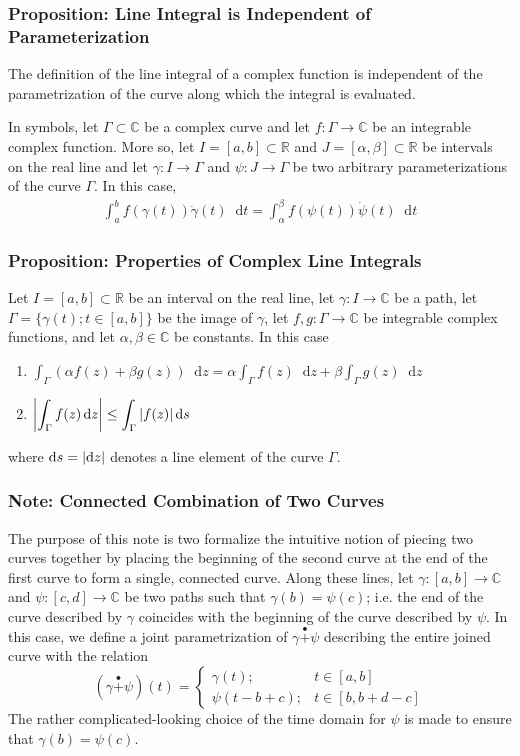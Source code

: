 \documentclass[11pt, a4paper]{article}
\newcommand{\diff}{\mathop{}\!\mathrm{d}} %
\newcommand{\R}{\mathbb{R}} %
\newcommand{\C}{\mathbb{C}} %
\begin{document}
\subsubsection{Proposition: Line Integral is Independent of Parameterization}
The definition of the line integral of a complex function is independent of the parametrization of the curve along which the integral is evaluated. 

In symbols, let $ \Gamma \subset \C $ be a complex curve and let $ f: \Gamma \to \C $ be an integrable complex function. More so, let $ I = [a, b] \subset \R $ and $ J =[\alpha, \beta] \subset \R  $ be intervals on the real line and let $ \gamma: I \to \Gamma $ and $ \psi: J \to \Gamma $ be two arbitrary parameterizations of the curve $ \Gamma $. In this case,
\begin{align*}
	\int_{a}^{b}f(\gamma(t)) \dot{\gamma}(t) \diff t = \int_{\alpha }^{\beta}f(\psi(t)) \dot{\psi}(t) \diff t
\end{align*}

\subsubsection{Proposition: Properties of Complex Line Integrals}
Let $ I = [a, b] \subset \R $ be an interval on the real line, let $ \gamma: I \to \C $ be a path, let $ \Gamma = \{ \gamma(t) ; t \in [a, b] \} $ be the image of $ \gamma $, let $ f, g: \Gamma \to \C $ be integrable complex functions, and let $ \alpha, \beta \in \C $ be constants. In this case
\begin{enumerate}
	\item $ \displaystyle{\int_{\Gamma}(\alpha f(z) + \beta g(z))\diff z = \alpha \int_{\Gamma} f(z) \diff z + \beta \int_{\Gamma} g(z) \diff z } $
	
	\item $ \displaystyle{\abs{\int_{\Gamma} f(z) \diff z } \leq \int_{\Gamma} \abs{f(z)} \diff s } $
\end{enumerate}
where $ \diff s = \abs{\diff z}$ denotes a line element of the curve $ \Gamma $.

\subsubsection{Note: Connected Combination of Two Curves}
The purpose of this note is two formalize the intuitive notion of piecing two curves together by placing the beginning of the second curve at the end of the first curve to form a single, connected curve.  Along these lines, let $ \gamma:[a, b] \to \C $ and $ \psi : [c, d] \to \C $ be two paths such that $ \gamma(b) = \psi(c) $; i.e. the end of the curve described by $ \gamma $ coincides with the beginning of the curve described by $ \psi $. In this case, we define a joint parametrization of $ \gamma \stackrel{\bullet}{+} \psi $ describing the entire joined curve with the relation
\[
(\gamma \stackrel{\bullet}{+} \psi)(t) = 
\begin{cases}
	\gamma(t); & t \in [a, b]\\
	\psi(t - b + c);	& t \in [b, b + d - c]
\end{cases}
\]
The rather complicated-looking choice of the time domain for $ \psi $ is made to ensure that $ \gamma(b) = \psi(c) $. 
\end{document}
